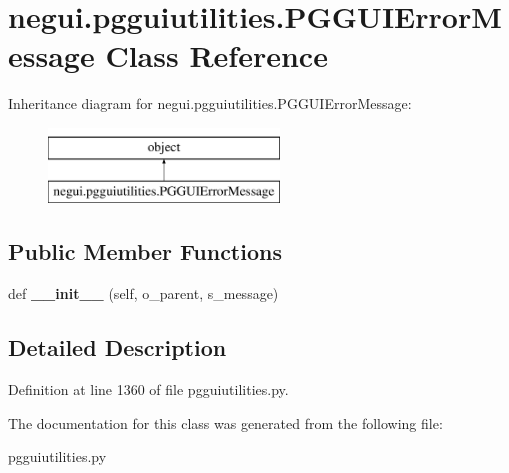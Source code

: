 \hypertarget{classnegui_1_1pgguiutilities_1_1PGGUIErrorMessage}{}\section{negui.\+pgguiutilities.\+P\+G\+G\+U\+I\+Error\+Message Class Reference}
\label{classnegui_1_1pgguiutilities_1_1PGGUIErrorMessage}
Inheritance diagram for negui.\+pgguiutilities.\+P\+G\+G\+U\+I\+Error\+Message\+:\begin{figure}[H]
\begin{center}
\leavevmode
\includegraphics[height=2.000000cm]{classnegui_1_1pgguiutilities_1_1PGGUIErrorMessage}
\end{center}
\end{figure}
\subsection*{Public Member Functions}
\begin{DoxyCompactItemize}
\item 
def {\bfseries \+\_\+\+\_\+init\+\_\+\+\_\+} (self, o\+\_\+parent, s\+\_\+message)\hypertarget{classnegui_1_1pgguiutilities_1_1PGGUIErrorMessage_a420fb489448327d2a25e10f35a6c3589}{}\label{classnegui_1_1pgguiutilities_1_1PGGUIErrorMessage_a420fb489448327d2a25e10f35a6c3589}

\end{DoxyCompactItemize}


\subsection{Detailed Description}


Definition at line 1360 of file pgguiutilities.\+py.



The documentation for this class was generated from the following file\+:\begin{DoxyCompactItemize}
\item 
pgguiutilities.\+py\end{DoxyCompactItemize}
